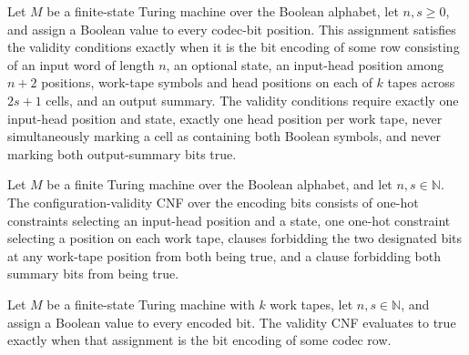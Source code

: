 \begin{theorem}
\label{Complexity.codecBitsValid_iff}
\leanok
{}
Let $M$ be a finite-state Turing machine over the Boolean alphabet, let $n,s\ge0$, and
assign a Boolean value to every codec-bit position. This assignment satisfies the
validity conditions exactly when it is the bit encoding of some row consisting of an
input word of length $n$, an optional state, an input-head position among $n+2$
positions, work-tape symbols and head positions on each of $k$ tapes across $2s+1$
cells, and an output summary. The validity conditions require exactly one input-head
position and state, exactly one head position per work tape, never simultaneously
marking a cell as containing both Boolean symbols, and never marking both output-summary
bits true.
\end{theorem}

\begin{definition}
\label{Complexity.codecValidity}
\leanok
{}
Let $M$ be a finite Turing machine over the Boolean alphabet, and let
$n,s\in\mathbb{N}$. The configuration-validity CNF over the encoding bits consists of
one-hot constraints selecting an input-head position and a state, one one-hot constraint
selecting a position on each work tape, clauses forbidding the two designated bits at
any work-tape position from both being true, and a clause forbidding both summary bits
from being true.
\end{definition}

\begin{theorem}
\label{Complexity.codecValidity_eval}
\leanok
{}
Let $M$ be a finite-state Turing machine with $k$ work tapes, let $n,s\in\mathbb{N}$,
and assign a Boolean value to every encoded bit. The validity CNF evaluates to true
exactly when that assignment is the bit encoding of some codec row.
\end{theorem}


